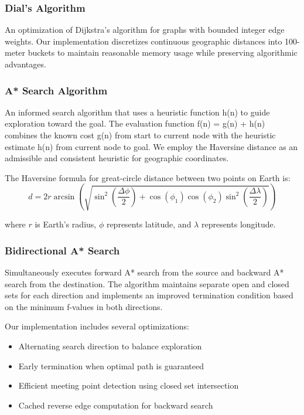 \documentclass[conference]{IEEEtran}
\begin{document}
\subsubsection{Dial's Algorithm}
An optimization of Dijkstra's algorithm for graphs with bounded integer edge weights. Our implementation discretizes continuous geographic distances into 100-meter buckets to maintain reasonable memory usage while preserving algorithmic advantages.

\subsubsection{A* Search Algorithm}
An informed search algorithm that uses a heuristic function h(n) to guide exploration toward the goal. The evaluation function f(n) = g(n) + h(n) combines the known cost g(n) from start to current node with the heuristic estimate h(n) from current node to goal. We employ the Haversine distance as an admissible and consistent heuristic for geographic coordinates.

The Haversine formula for great-circle distance between two points on Earth is:
\begin{equation}
d = 2r \arcsin\left(\sqrt{\sin^2\left(\frac{\Delta\phi}{2}\right) + \cos(\phi_1)\cos(\phi_2)\sin^2\left(\frac{\Delta\lambda}{2}\right)}\right)
\end{equation}

where $r$ is Earth's radius, $\phi$ represents latitude, and $\lambda$ represents longitude.

\subsubsection{Bidirectional A* Search}
Simultaneously executes forward A* search from the source and backward A* search from the destination. The algorithm maintains separate open and closed sets for each direction and implements an improved termination condition based on the minimum f-values in both directions.

Our implementation includes several optimizations:
\begin{itemize}
\item Alternating search direction to balance exploration
\item Early termination when optimal path is guaranteed
\item Efficient meeting point detection using closed set intersection
\item Cached reverse edge computation for backward search
\end{itemize}
\end{document}
